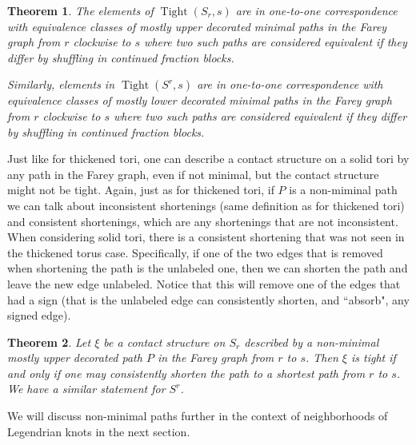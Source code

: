 \documentclass[11pt]{amsart}
\theoremstyle{plain}
\newtheorem{theorem}{Theorem}
\theoremstyle{definition}
\theoremstyle{remark}
\numberwithin{theorem}{section}
\DeclareMathOperator{\Tight}{Tight}
\begin{document}
\begin{theorem}
	\label{thm:continued_block}
	The elements of $\Tight(S_r,s)$ are in one-to-one correspondence with equivalence classes of mostly upper decorated minimal paths in the Farey graph from $r$ clockwise to $s$ where two such paths are considered equivalent if they differ by shuffling in continued fraction blocks. 

Similarly, elements in $\Tight(S^r,s)$ are in one-to-one correspondence with equivalence classes of mostly lower decorated minimal paths in the Farey graph from $r$ clockwise to $s$ where two such paths are considered equivalent if they differ by shuffling in continued fraction blocks. 
\end{theorem}
Just like for thickened tori, one can describe a contact structure on a solid tori by any path in the Farey graph, even if not minimal, but the contact structure might not be tight. Again, just as for thickened tori, if $P$ is a non-miminal path we can talk about inconsistent shortenings (same definition as for thickened tori) and consistent shortenings, which are any shortenings that are not inconsistent. When considering solid tori, there is a consistent shortening that was not seen in the thickened torus case.  Specifically, if one of the two edges that is removed when shortening the path is the unlabeled one, then we can shorten the path and leave the new edge unlabeled. Notice that this will remove one of the edges that had a sign (that is the unlabeled edge can consistently shorten, and ``absorb", any signed edge). 

\begin{theorem}
Let $\xi$ be a contact structure on $S_r$ described by a non-minimal mostly upper decorated path $P$ in the Farey graph from $r$ to $s$. Then $\xi$ is tight if and only if one may consistently shorten the path to a shortest path from $r$ to $s$. We have a similar statement for $S^r$. 
	\end{theorem}

We will discuss non-minimal paths further in the context of neighborhoods of Legendrian knots in the next section. 
\end{document}
